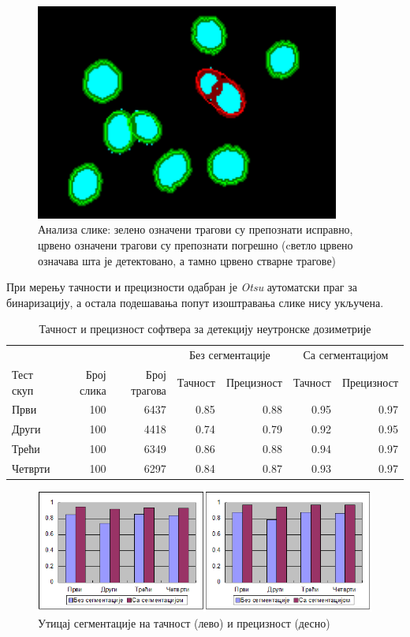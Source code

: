 \documentclass[11pt,a4paper,serbian,oneside]{book}
\begin{document}
\begin{figure}[H]
\begin{center}
\includegraphics[width=100mm]{images/analysis.png}
\end{center}
\caption{Анализа слике: зелено означени трагови су препознати исправно, црвено означени трагови су препознати погрешно (cветло црвено означава шта је детектовано, а тамно црвено стварне трагове) }
\label{fig:analysis}
\end{figure}

При мерењу тачности и прецизности одабран је \textit{Otsu} аутоматски праг за бинаризацију, а остала подешавања попут изоштравања слике нису укључена.

\begin{table}[H]
\centering
\caption{Тачност и прецизност софтвера за детекцију неутронске дозиметрије}
\begin{tabular}{lrrrrrr}
\hline
& & & \multicolumn{2}{c}{Без сегментације} & \multicolumn{2}{c}{Са сегментацијом} \\
Тест скуп & Број слика & Број трагова & Тачност & Прецизност & Тачност &  Прецизност \\
\hline
Први & 100 & 6437 & 0.85 & 0.88 & 0.95 & 0.97 \\
Други & 100 & 4418 & 0.74 & 0.79 & 0.92 & 0.95 \\
Трећи & 100 & 6349 & 0.86 & 0.88 & 0.94 & 0.97 \\
Четврти & 100 & 6297 & 0.84 & 0.87 & 0.93 & 0.97 \\
\hline
\end{tabular}
\label{tab:metrics}
\end{table} 

\begin{figure}[H]
\begin{center}
\includegraphics[width=150mm]{images/segmentation_results.png}
\end{center}
\caption{Утицај сегментације на тачност (лево) и прецизност (десно)}
\label{fig:seginf}
\end{figure}
\end{document}
